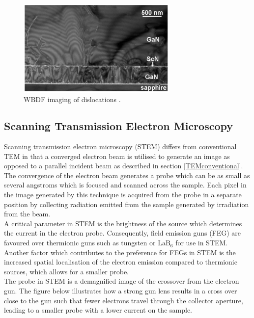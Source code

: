 \begin{figure}[!ht]
	\centering
	\includegraphics[width=0.7\textwidth]{Figs/Ch2/moramwbdf.png}
	\caption[h] {WBDF imaging of dislocations \cite{Moram2007}.}
	\label{shellywbdf}
\end{figure}
\FloatBarrier



\subsection{Scanning Transmission Electron Microscopy}

Scanning transmission electron microscopy (STEM) differs from conventional TEM in that a converged electron beam is utilised to generate an image as opposed to a parallel incident beam as described in section \ref{TEMconventional}. The convergence of the electron beam generates a probe which can be as small as several angstroms which is focused and scanned across the sample. Each pixel in the image generated by this technique is acquired from the probe in a separate position by collecting radiation emitted from the sample generated by irradiation from the beam.\\
A critical parameter in STEM is the brightness of the source which determines the current in the electron probe. Consequently, field emission guns (FEG) are favoured over thermionic guns such as tungsten or $\mathrm{LaB_{6}}$ for use in STEM. Another factor which contributes to the preference for FEGs in STEM is the increased spatial localisation of the electron emission compared to thermionic sources, which allows for a smaller probe.\\
The probe in STEM is a demagnified image of the crossover from the electron gun. The figure below illustrates how a strong gun lens results in a cross over close to the gun such that fewer electrons travel through the collector aperture, leading to a smaller probe with a lower current on the sample. 

